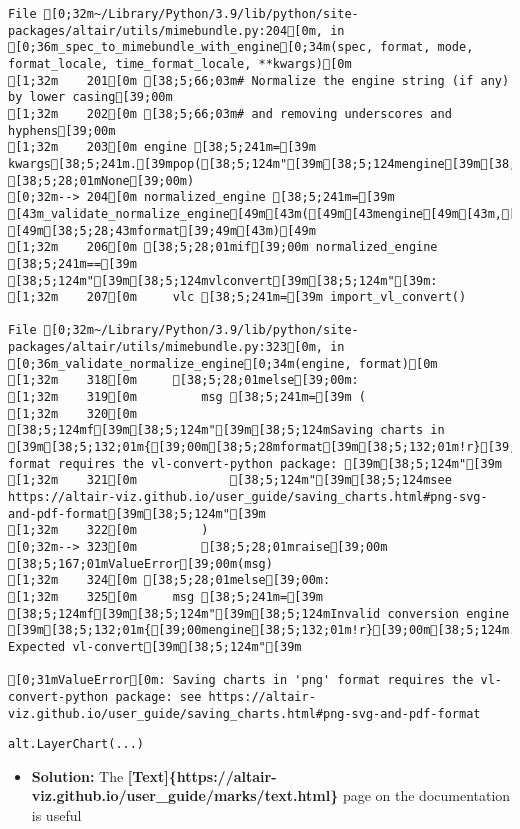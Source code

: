 \documentclass[
  letterpaper,
  DIV=11,
  numbers=noendperiod]{scrartcl}
\providecommand{\tightlist}{%
  \setlength{\itemsep}{0pt}\setlength{\parskip}{0pt}}\usepackage{longtable,booktabs,array}
\begin{document}
\begin{verbatim}
File [0;32m~/Library/Python/3.9/lib/python/site-packages/altair/utils/mimebundle.py:204[0m, in [0;36m_spec_to_mimebundle_with_engine[0;34m(spec, format, mode, format_locale, time_format_locale, **kwargs)[0m
[1;32m    201[0m [38;5;66;03m# Normalize the engine string (if any) by lower casing[39;00m
[1;32m    202[0m [38;5;66;03m# and removing underscores and hyphens[39;00m
[1;32m    203[0m engine [38;5;241m=[39m kwargs[38;5;241m.[39mpop([38;5;124m"[39m[38;5;124mengine[39m[38;5;124m"[39m, [38;5;28;01mNone[39;00m)
[0;32m--> 204[0m normalized_engine [38;5;241m=[39m [43m_validate_normalize_engine[49m[43m([49m[43mengine[49m[43m,[49m[43m [49m[38;5;28;43mformat[39;49m[43m)[49m
[1;32m    206[0m [38;5;28;01mif[39;00m normalized_engine [38;5;241m==[39m [38;5;124m"[39m[38;5;124mvlconvert[39m[38;5;124m"[39m:
[1;32m    207[0m     vlc [38;5;241m=[39m import_vl_convert()

File [0;32m~/Library/Python/3.9/lib/python/site-packages/altair/utils/mimebundle.py:323[0m, in [0;36m_validate_normalize_engine[0;34m(engine, format)[0m
[1;32m    318[0m     [38;5;28;01melse[39;00m:
[1;32m    319[0m         msg [38;5;241m=[39m (
[1;32m    320[0m             [38;5;124mf[39m[38;5;124m"[39m[38;5;124mSaving charts in [39m[38;5;132;01m{[39;00m[38;5;28mformat[39m[38;5;132;01m!r}[39;00m[38;5;124m format requires the vl-convert-python package: [39m[38;5;124m"[39m
[1;32m    321[0m             [38;5;124m"[39m[38;5;124msee https://altair-viz.github.io/user_guide/saving_charts.html#png-svg-and-pdf-format[39m[38;5;124m"[39m
[1;32m    322[0m         )
[0;32m--> 323[0m         [38;5;28;01mraise[39;00m [38;5;167;01mValueError[39;00m(msg)
[1;32m    324[0m [38;5;28;01melse[39;00m:
[1;32m    325[0m     msg [38;5;241m=[39m [38;5;124mf[39m[38;5;124m"[39m[38;5;124mInvalid conversion engine [39m[38;5;132;01m{[39;00mengine[38;5;132;01m!r}[39;00m[38;5;124m. Expected vl-convert[39m[38;5;124m"[39m

[0;31mValueError[0m: Saving charts in 'png' format requires the vl-convert-python package: see https://altair-viz.github.io/user_guide/saving_charts.html#png-svg-and-pdf-format
\end{verbatim}

\begin{verbatim}
alt.LayerChart(...)
\end{verbatim}

\begin{itemize}
\tightlist
\item
  \textbf{Solution:} The
  \textbf{{[}Text{]}\{https://altair-viz.github.io/user\_guide/marks/text.html\}}
  page on the documentation is useful
\end{itemize}
\end{document}
